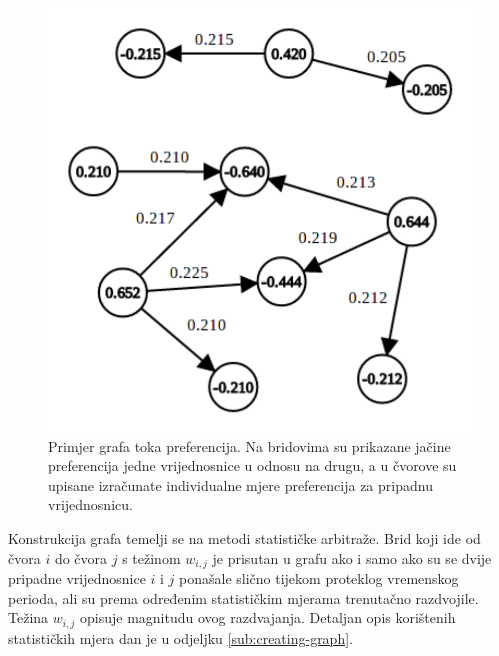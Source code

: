 \documentclass[lmodern, utf8, diplomski, numeric]{fer}
\begin{document}
  \begin{figure}[h]
    \centering
    \includegraphics[width=0.5\columnwidth]{graphics/graph.pdf}
    \caption{Primjer grafa toka preferencija. Na bridovima su prikazane jačine preferencija jedne vrijednosnice u odnosu na drugu, a u čvorove su upisane izračunate individualne mjere preferencija za pripadnu vrijednosnicu.}
    \label{fig:graph}
  \end{figure}
  
  Konstrukcija grafa temelji se na metodi statističke arbitraže.
  Brid koji ide od čvora $i$ do čvora $j$ s težinom $w_{i,j}$ je prisutan u grafu ako i samo ako su se dvije pripadne vrijednosnice $i$ i $j$ ponašale slično tijekom proteklog vremenskog perioda, ali su prema određenim statističkim mjerama trenutačno razdvojile.
  Težina $w_{i,j}$ opisuje magnitudu ovog razdvajanja.
  Detaljan opis korištenih statističkih mjera dan je u odjeljku \ref{sub:creating-graph}.
    
\end{document}
